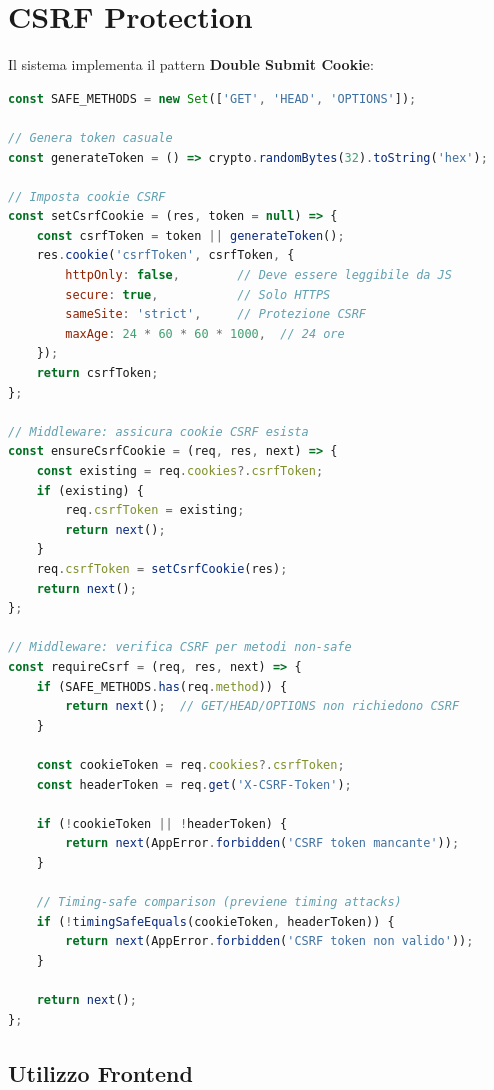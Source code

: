 \documentclass[11pt,a4paper]{article}
\begin{document}
\section{CSRF Protection}\label{sec:csrf}

Il sistema implementa il pattern \textbf{Double Submit Cookie}:

\begin{lstlisting}[language=JavaScript, caption={CSRF Middleware - server/middleware/csrf.js}]
const SAFE_METHODS = new Set(['GET', 'HEAD', 'OPTIONS']);

// Genera token casuale
const generateToken = () => crypto.randomBytes(32).toString('hex');

// Imposta cookie CSRF
const setCsrfCookie = (res, token = null) => {
    const csrfToken = token || generateToken();
    res.cookie('csrfToken', csrfToken, {
        httpOnly: false,        // Deve essere leggibile da JS
        secure: true,           // Solo HTTPS
        sameSite: 'strict',     // Protezione CSRF
        maxAge: 24 * 60 * 60 * 1000,  // 24 ore
    });
    return csrfToken;
};

// Middleware: assicura cookie CSRF esista
const ensureCsrfCookie = (req, res, next) => {
    const existing = req.cookies?.csrfToken;
    if (existing) {
        req.csrfToken = existing;
        return next();
    }
    req.csrfToken = setCsrfCookie(res);
    return next();
};

// Middleware: verifica CSRF per metodi non-safe
const requireCsrf = (req, res, next) => {
    if (SAFE_METHODS.has(req.method)) {
        return next();  // GET/HEAD/OPTIONS non richiedono CSRF
    }
    
    const cookieToken = req.cookies?.csrfToken;
    const headerToken = req.get('X-CSRF-Token');
    
    if (!cookieToken || !headerToken) {
        return next(AppError.forbidden('CSRF token mancante'));
    }
    
    // Timing-safe comparison (previene timing attacks)
    if (!timingSafeEquals(cookieToken, headerToken)) {
        return next(AppError.forbidden('CSRF token non valido'));
    }
    
    return next();
};
\end{lstlisting}

\subsection{Utilizzo Frontend}
\end{document}
